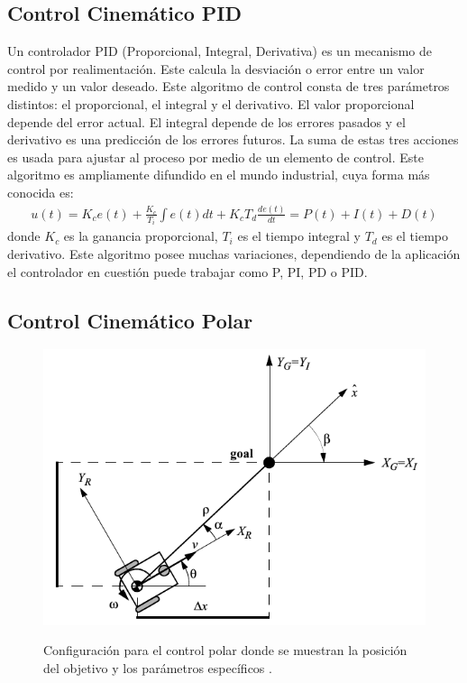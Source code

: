 \subsection{Control Cinem\'atico PID}

Un controlador PID (Proporcional, Integral, Derivativa) es un mecanismo de control 
por realimentaci\'on. Este calcula la desviaci\'on o error entre un valor medido y 
un valor deseado. Este algoritmo de control consta de tres par\'ametros distintos: el 
proporcional, el integral y el derivativo. El valor proporcional depende del error 
actual. El integral depende de los errores pasados y el derivativo es una predicci\'on 
de los errores futuros. La suma de estas tres acciones es usada para ajustar al 
proceso por medio de un elemento de control. Este algoritmo es ampliamente 
difundido en el mundo industrial, cuya forma m\'as conocida es:
\begin{align*}
u(t) = K_c e(t) + \frac{K_c}{T_i} \int e(t)dt + K_c T_d \frac{de(t)}{dt} = P(t) + I(t) + D(t)
\end{align*}
donde $K_c$ es la ganancia proporcional, $T_i$ es el tiempo integral y $T_d$ es 
el tiempo derivativo. Este algoritmo posee muchas variaciones, dependiendo de 
la aplicaci\'on el controlador en cuesti\'on puede trabajar como P, PI, PD o PID.

\subsection{Control Cinem\'atico Polar}

\begin{figure}%
\centering \footnotesize
 {\includegraphics[width=0.60\linewidth]{images/control_polar.png}}
 \captionsetup{font=footnotesize}
 \caption{Configuraci\'on para el control polar donde se muestran la posici\'on del 
 objetivo y los par\'ametros espec\'ificos \cite{siegwart2011introduction}.}
\label{f:controlPolar}
\end{figure}

